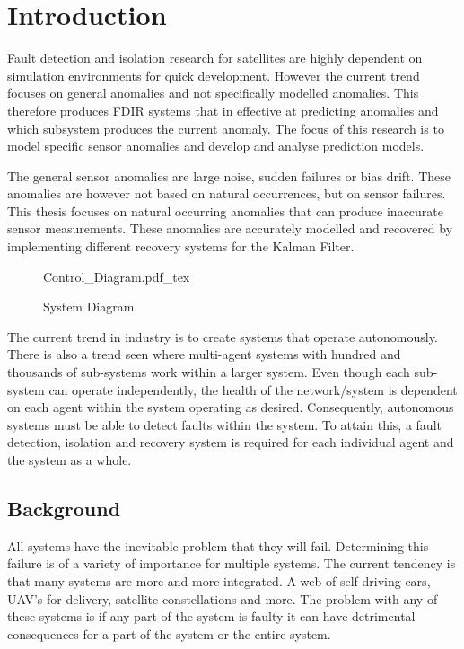 %
%


\chapter{Introduction}
\label{chap:Introduction}

Fault detection and isolation research for satellites are highly dependent on simulation environments for quick development. However the current trend focuses on general anomalies and not specifically modelled anomalies. This therefore produces FDIR systems that in effective at predicting anomalies and which subsystem produces the current anomaly. The focus of this research is to model specific sensor anomalies and develop and analyse prediction models. 

The general sensor anomalies are large noise, sudden failures or bias drift. These anomalies are however not based on natural occurrences, but on sensor failures. This thesis focuses on natural occurring anomalies that can produce inaccurate sensor measurements. These anomalies are accurately modelled and recovered by implementing different recovery systems for the Kalman Filter. 

\begin{figure}[h!b!t]
	\centering
	\def\svgwidth{14cm}
	{Control_Diagram.pdf_tex}
	\caption{System Diagram}
	\label{fig:System_Diagram}
\end{figure}


The current trend in industry is to create systems that operate autonomously. There is also a trend seen where multi-agent systems with hundred and thousands of sub-systems work within a larger system. Even though each sub-system can operate independently, the health of the network/system is dependent on each agent within the system operating as desired. Consequently, autonomous systems must be able to detect faults within the system. To attain this, a fault detection, isolation and recovery system is required for each individual agent and the system as a whole.

\section{Background}
All systems have the inevitable problem that they will fail. Determining this failure is of a variety of importance for multiple systems. The current tendency is that many systems are more and more integrated. A web of self-driving cars, UAV's for delivery, satellite constellations and more. The problem with any of these systems is if any part of the system is faulty it can have detrimental consequences for a part of the system or the entire system.

